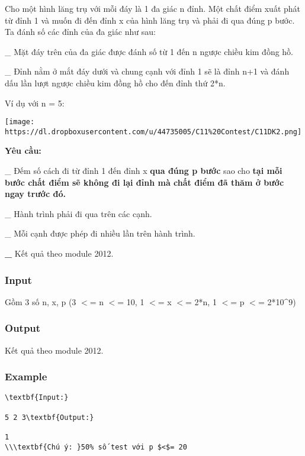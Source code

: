 



   Cho một hình lăng trụ với mỗi đáy là 1 đa giác n đỉnh. Một chất điểm xuất phát từ đỉnh 1 và muốn đi đến đỉnh x của hình lăng trụ và phải đi qua đúng p bước. Ta đánh số các đỉnh của đa giác như sau:  

   \_ Mặt đáy trên của đa giác được đánh số từ 1 đến n ngược chiều kim đồng hồ.  

   \_ Đỉnh nằm ở mắt đáy dưới và chung cạnh với đỉnh 1 sẽ là đỉnh n+1 và đánh dấu lần lượt ngược chiều kim đồng hồ cho đến đỉnh thứ 2*n.  

   Ví dụ với n = 5:  


\texttt{[image: https://dl.dropboxusercontent.com/u/44735005/C11\%20Contest/C11DK2.png]}

\textbf{    Yêu cầu:   }

   \_ Đếm số cách đi từ đỉnh 1 đến đỉnh x   \textbf{    qua đúng p bước   }   sao cho   \textbf{    tại mỗi bước chất điểm sẽ không đi lại đỉnh mà chất điểm đã thăm ở bước ngay trước đó.   }\textbf{}

   \_ Hành trình phải đi qua trên các cạnh.  

   \_ Mỗi cạnh được phép đi nhiều lần trên hành trình.  

\textbf{    \_   }   Kết quả theo module 2012.  

\subsubsection{   Input  }

   Gồm 3 số n, x, p (3 $<$= n $<$= 10, 1 $<$= x $<$= 2*n, 1 $<$= p $<$= 2*10\textasciicircum9)  

\subsubsection{   Output  }

   Kết quả theo module 2012.  

\subsubsection{   Example  }
\begin{verbatim}
\textbf{Input:}

5 2 3\textbf{Output:}

1
\\\textbf{Chú ý: }50% số test với p $<$= 20
\end{verbatim}